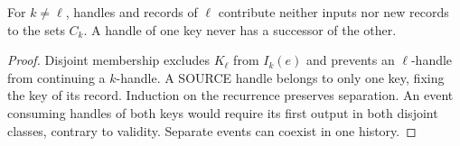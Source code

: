 \documentclass[../main.tex]{subfiles}
\begin{document}
\begin{theorem}
\label{thm:kpc-invariants:key-isolation}
For $k\ne\ell$, handles and records of $\ell$ contribute neither inputs
nor new records to the sets $C_k$. A handle of one key never has a
successor of the other.
\end{theorem}
\begin{proof}
Disjoint membership excludes $K_\ell$ from $I_k(e)$ and prevents an
$\ell$-handle from continuing a $k$-handle. A SOURCE handle belongs to
only one key, fixing the key of its record. Induction on the recurrence
preserves separation. An event consuming handles of both keys would
require its first output in both disjoint classes, contrary to validity.
Separate events can coexist in one history.
\end{proof}
\end{document}
